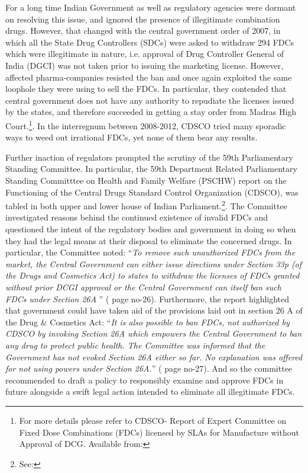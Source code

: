 \documentclass[AER]{AEA}
\theoremstyle{theorem}
\begin{document}
For a long time Indian Government as well as regulatory agencies were dormant on resolving this issue, and ignored the presence of illegitimate combination drugs. However, that changed with the central government order of 2007, in which all the State Drug Controllers (SDCs) were asked to withdraw 294 FDCs which were illegitimate in nature, i.e. approval of Drug Controller General of India (DGCI) was not taken prior to issuing the marketing license. However, affected pharma-companies resisted the ban and once again exploited the same loophole they were using to sell the FDCs. In particular, they contended that central government does not have any authority to repudiate the licenses issued by the states, and therefore succeeded in getting a stay order from Madras High Court.\footnote{For more details please refer to CDSCO- Report of Expert Committee on Fixed Dose Combinations (FDCs) licensed by SLAs for Manufacture without Approval of DCG. Available from: \FFive}. In the interregnum between 2008-2012, CDSCO tried many sporadic ways to weed out irrational FDCs, yet none of them bear any results.

Further inaction of regulators prompted the scrutiny of the 59th Parliamentary Standing Committee. In particular, the 59th Department Related Parliamentary Standing Committtee on Health and Family Welfare (PSCHW) report on the Functioning of the Central Drugs Standard Control Organization (CDSCO), was tabled in both upper and lower house of Indian Parliament.\footnote{See:\FSix}. The Committee investigated  reasons behind the continued existence of invalid FDCs and questioned the intent of the regulatory bodies and government in doing so when they had the legal means at their disposal to eliminate the concerned drugs. In particular, the Committee noted: ``\textit{To remove such unauthorized FDCs from the market, the Central Government can either issue directions under Section 33p (of the Drugs and Cosmetics Act) to states to withdraw the licenses of FDCs granted without prior DCGI approval or the Central Government can itself ban such FDCs under Section 26A }'' (\cite{PSCHFW} page no-26). Furthermore, the report highlighted that government could have taken aid of the provisions laid out in section 26 A of the Drug \& Cosmetics Act: ``\textit{It is also possible to ban FDCs, not authorized by CDSCO by invoking Section 26A which empowers the Central Government to ban any drug to protect public health. The Committee was informed that the Government has not evoked Section 26A either so far. No explanation was offered for not using powers under Section 26A.}'' (\cite{PSCHFW} page no-27). And so the committee recommended to draft a policy to responsibly examine and approve FDCs in future alongside a swift legal action intended to eliminate all illegitimate FDCs.
\end{document}
